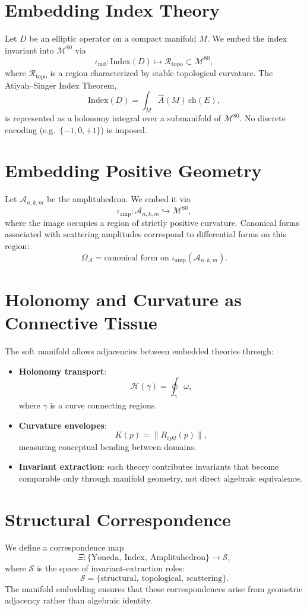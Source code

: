 \documentclass[11pt]{article}
\begin{document}
\section{Embedding Index Theory}
Let $D$ be an elliptic operator on a compact manifold $M$. We embed the index
invariant into $\mathcal{M}^{80}$ via
\[
\iota_{\mathrm{ind}} : \mathrm{Index}(D) \mapsto \mathcal{R}_{\mathrm{topo}}
\subset \mathcal{M}^{80},
\]
where $\mathcal{R}_{\mathrm{topo}}$ is a region characterized by stable
topological curvature. The Atiyah--Singer Index Theorem,
\[
\mathrm{Index}(D) = \int_M \hat{A}(M)\,\mathrm{ch}(E),
\]
is represented as a holonomy integral over a submanifold of $\mathcal{M}^{80}$.
No discrete encoding (e.g.\ $\{-1,0,+1\}$) is imposed.

\section{Embedding Positive Geometry}
Let $\mathcal{A}_{n,k,m}$ be the amplituhedron. We embed it via
\[
\iota_{\mathrm{amp}} : \mathcal{A}_{n,k,m} \hookrightarrow \mathcal{M}^{80},
\]
where the image occupies a region of strictly positive curvature. Canonical
forms associated with scattering amplitudes correspond to differential forms
on this region:
\[
\Omega_{\mathcal{A}} = \text{canonical form on } \iota_{\mathrm{amp}}(\mathcal{A}_{n,k,m}).
\]

\section{Holonomy and Curvature as Connective Tissue}
The soft manifold allows adjacencies between embedded theories through:
\begin{itemize}
    \item \textbf{Holonomy transport}:
    \[
    \mathcal{H}(\gamma) = \oint_\gamma \omega,
    \]
    where $\gamma$ is a curve connecting regions.
    \item \textbf{Curvature envelopes}:
    \[
    K(p) = \|R_{ijkl}(p)\|,
    \]
    measuring conceptual bending between domains.
    \item \textbf{Invariant extraction}:
    each theory contributes invariants that become comparable only through
    manifold geometry, not direct algebraic equivalence.
\end{itemize}

\section{Structural Correspondence}
We define a correspondence map
\[
\Xi : \{\text{Yoneda},\ \text{Index},\ \text{Amplituhedron}\}
\to \mathcal{S},
\]
where $\mathcal{S}$ is the space of invariant-extraction roles:
\[
\mathcal{S} = \{\text{structural},\ \text{topological},\ \text{scattering}\}.
\]
The manifold embedding ensures that these correspondences arise from geometric
adjacency rather than algebraic identity.
\end{document}
